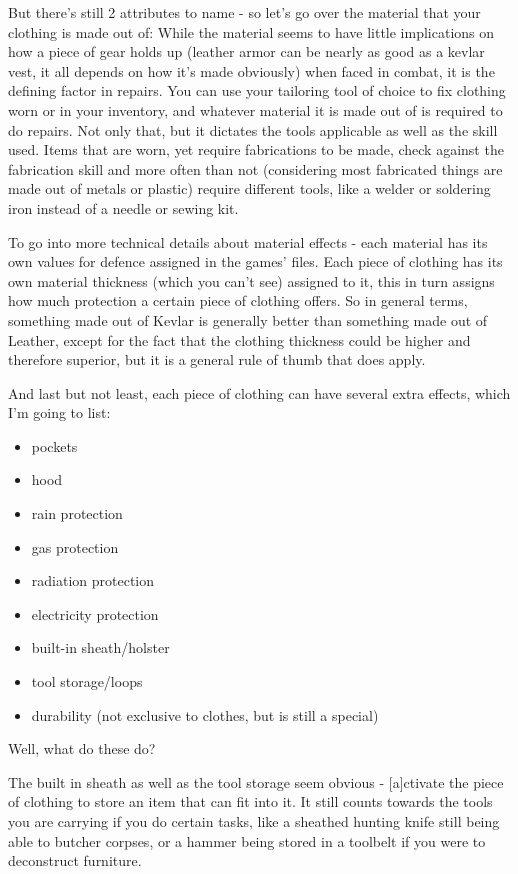 But there's still 2 attributes to name - so let's go over the material that your clothing is made out of: While the material seems to have little implications on how a piece of gear holds up (leather armor can be nearly as good as a kevlar vest, it all depends on how it's made obviously) when faced in combat, it is the defining factor in repairs. You can use your tailoring tool of choice to fix clothing worn or in your inventory, and whatever material it is made out of is required to do repairs. Not only that, but it dictates the tools applicable as well as the skill used. Items that are worn, yet require fabrications to be made, check against the fabrication skill and more often than not (considering most fabricated things are made out of metals or plastic) require different tools, like a welder or soldering iron instead of a needle or sewing kit.

To go into more technical details about material effects - each material has its own values for defence assigned in the games' files. Each piece of clothing has its own material thickness (which you can't see) assigned to it, this in turn assigns how much protection a certain piece of clothing offers. So in general terms, something made out of Kevlar is generally better than something made out of Leather, except for the fact that the clothing thickness could be higher and therefore superior, but it is a general rule of thumb that does apply.

And last but not least, each piece of clothing can have several extra effects, which I'm going to list:

\begin{itemize}
\item pockets
\item hood
\item rain protection
\item gas protection
\item radiation protection
\item electricity protection
\item built-in sheath/holster
\item tool storage/loops
\item durability (not exclusive to clothes, but is still a special)
\end{itemize}

Well, what do these do?

The built in sheath as well as the tool storage seem obvious - [a]ctivate the piece of clothing to store an item that can fit into it. It still counts towards the tools you are carrying if you do certain tasks, like a sheathed hunting knife still being able to butcher corpses, or a hammer being stored in a toolbelt if you were to deconstruct furniture.


